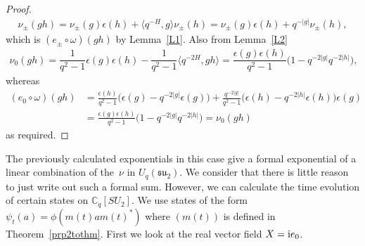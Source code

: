 \documentclass[pdftex]{sigma}
\numberwithin{equation}{section}
\newcommand{\C}{\mathbb{C}}
\newcommand{\<}{\langle}
\renewcommand{\>}{\rangle}
\begin{document}
\begin{proof}
\begin{gather*}
	\nu_{\pm}(g h)=		\nu_{\pm}(g) \epsilon (h) +\big\langle q^{-H},g\big\rangle \nu_{\pm} (h) =		\nu_{\pm}(g) \epsilon (h) +q^{-|g|} 	\nu_{\pm} (h),
\end{gather*}
which is $ (e_{\pm} \circ \omega)(gh) $ by Lemma~\ref{L1}. Also from Lemma~\ref{L2}
\begin{gather*}
	\nu_{0}(g h)= \dfrac{1}{q^{2}-1}\epsilon (g)\epsilon (h)-\dfrac{1}{q^{2}-1}\big\langle q^{-2H},g h\big\rangle = \dfrac{\epsilon (g)\epsilon (h)}{q^{2}-1}\big(1-q^{-2|g|} q^{-2|h|} \big),
\end{gather*}
whereas
\begin{align*}
	(e_{0} \circ \omega)(g h)&= \frac{\epsilon (h)}{q^{2}-1}\big(\epsilon (g)-q^{-2|g|}\epsilon (g)\big)+ \frac{q^{-2|g|}}{q^{2}-1} \big(\epsilon (h)-q^{-2|h|}\epsilon (h)\big)\epsilon (g)\\
	&= \frac{\epsilon (g)\epsilon (h)}{q^{2}-1}\big(1-q^{-2|g|}q^{-2|h|}\big)=\nu_{0}(g h)
\end{align*}
as required.
\end{proof}

The previously calculated exponentials in this case give a formal exponential of a linear combination of the~$ \nu$ in $U_{q}({\mathfrak{su}}_{2}) $. We consider that there is little reason to just write out such a formal sum. However, we can calculate the time evolution of certain states on $ \C_{q}[SU_{2}] $. We use states of the form $ \psi_t(a)=\phi(m(t) a m(t)^{*}) $ where $ (m(t) )$ is defined in Theorem~\ref{prp2tothm}. First we look at the real vector field $ X= {\rm i} e_{0} $.
\end{document}
